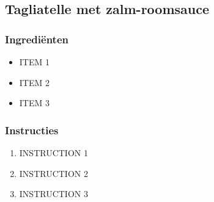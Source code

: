 \subsection{Tagliatelle met zalm-roomsauce}
\subsubsection*{Ingrediënten}
\begin{multicols}{2}
    \begin{itemize}
        \item ITEM 1
        \item ITEM 2
        \item ITEM 3
    \end{itemize}
\end{multicols}

\subsubsection*{Instructies}
\begin{enumerate}
    \item INSTRUCTION 1
    \item INSTRUCTION 2
    \item INSTRUCTION 3
\end{enumerate}